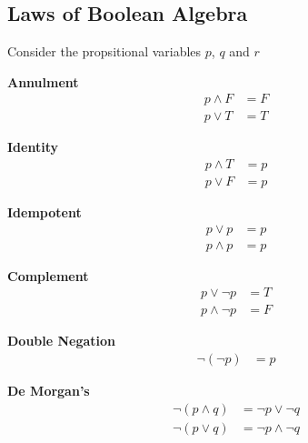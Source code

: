\subsection{Laws of Boolean Algebra}\label{mod1:section:BooleanAlgebraLaws}



\noindent Consider the propsitional variables $p$, $q$ and $r$


\begin{law}\label{mod1:law:Annulment}
   \textbf{Annulment}
   \begin{align}
   p \land F &= F  \\
   p \lor T &= T 
   \end{align}
\end{law}


\begin{law}\label{mod1:law:Identity}
   \textbf{Identity}
   \begin{align}
   p \land T &= p  \\
   p \lor F &= p
   \end{align}
\end{law}

\begin{law}\label{mod1:law:Idempotent}
   \textbf{Idempotent}
   \begin{align}
   p \lor p &= p\\
   p \land p &= p
   \end{align}
\end{law}

\begin{law}\label{mod1:law:Complement}
   \textbf{Complement}
   \begin{align}
   p \lor \lnot p &= T\\
   p \land \lnot p &= F
   \end{align}
\end{law}

\begin{law}\label{mod1:law:DoubleNegation}
   \textbf{Double Negation}
   \begin{align}
   \lnot(\lnot p) &= p
   \end{align}
\end{law}

\begin{law}\label{mod1:law:DeMorgan}
   \textbf{De Morgan's}
   \begin{align}
   \lnot (p \land q) &= \lnot p \lor \lnot q \\
   \lnot (p \lor q) &= \lnot p \land \lnot q 
   \end{align}
\end{law}

